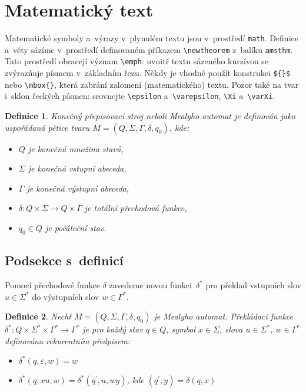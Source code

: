 \documentclass[twocolumn, a4paper, 11pt]{article}
\newtheorem{defin}{Definice}
\theoremstyle{plain}
\begin{document}
\section{Matematický text}
Matematické symboly a~výrazy v~plynulém textu jsou v~prostředí \verb|math|. Definice a~věty sázíme v~prostředí
definovaném příkazem \verb|\newtheorem| z~balíku \verb|amsthm|.
Tato prostředí obracejí význam \verb|\emph|: uvnitř textu
sázeného kurzívou se zvýrazňuje písmem v~základním
řezu. Někdy je vhodné použít konstrukci \verb|${}$|
nebo \verb|\mbox{}|, která zabrání zalomení (matematického)
textu. Pozor také na tvar i~sklon řeckých písmen:
srovnejte \verb|\epsilon| a~\verb|\varepsilon|, \verb|\Xi| a~\verb|\varXi|.
\begin{defin}
    \label{def:mealyho_automat}\emph{Konečný přepisovací stroj} neboli \emph{Mea\-lyho automat} je definován jako uspořádaná pětice tvaru $M = (Q, \varSigma , \varGamma , \delta , q_0)$, kde:
    \begin{itemize}
        \item $Q$ je konečná množina \emph{stavů},
        \item $\varSigma$ je konečná \emph{vstupní abeceda},
        \item $\varGamma$ je konečná \emph{výstupní abeceda},
        \item $\delta : Q \times \varSigma \rightarrow Q \times \varGamma$ je totální \emph{přechodová funkce},
        \item $q_0 \in Q$ je \emph{počáteční stav}.
    \end{itemize}
\end{defin}
\subsection{Podsekce s~definicí}
Pomocí přechodové funkce $\delta$ zavedeme novou funkci~$\delta^*$ pro překlad vstupních slov $u \in \varSigma^*$ do výstupních slov $w \in \varGamma^*$.
\begin{defin}
    Nechť $M = (Q,\varSigma,\varGamma,\delta,q_0)$ je Mealyho automat.
    \emph{Překládací funkce} $\delta^* : Q \times \varSigma^* \times \varGamma^* \rightarrow \varGamma^*$ je pro každý stav $q \in Q$,
    symbol $x \in \varSigma$, slova $u \in \varSigma^*$, $w \in \varGamma^*$ definována rekurentním předpisem:
    \begin{itemize}
        \item $\delta^* (q,\varepsilon, w) = w$
        \item $\delta^* (q, xu, w) = \delta^* (q^\prime, u, wy)$, kde $(q^\prime, y) = \delta(q,x)$
    \end{itemize}
\end{defin}
\end{document}
